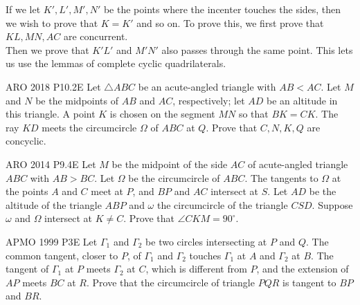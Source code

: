\begin{minipage}{.5\linewidth}
    \begin{solution}
        If we let $K', L', M', N'$ be the points where the incenter touches the
        sides, then we wish to prove that $K= K'$ and so on. To prove this, we
        first prove that $KL, MN, AC$ are concurrent. \\

        Then we prove that $K'L'$ and $M'N'$ also passes through the same
        point. This lets us use the lemmas of complete cyclic quadrilaterals.
    \end{solution}
\end{minipage}\hfill%
\begin{minipage}{.5\linewidth}
\end{minipage}



{ARO 2018 P10.2}{E}{
    Let $\triangle ABC$ be an acute-angled triangle with $AB<AC$. Let
    $M$ and $N$ be the midpoints of $AB$ and $AC$, respectively; let $AD$ be an
    altitude in this triangle. A point $K$ is chosen on the segment $MN$ so that
    $BK=CK$. The ray $KD$ meets the circumcircle $\Omega$ of $ABC$ at $Q$. Prove
    that $C, N, K, Q$ are concyclic.
}



{ARO 2014 P9.4}{E}{
    Let $M$ be the midpoint of the side $AC$ of acute-angled triangle
    $ABC$ with $AB>BC$. Let $\Omega $ be the circumcircle of $ ABC$. The tangents
    to $ \Omega $ at the points $A$ and $C$ meet at $P$, and $BP$ and $AC$
    intersect at $S$. Let $AD$ be the altitude of the triangle $ABP$ and $\omega$
    the circumcircle of the triangle $CSD$. Suppose $ \omega$ and $ \Omega $
    intersect at $K\not= C$. Prove that $ \angle CKM=90^\circ $.
}



{APMO 1999 P3}{E}{
    Let $\Gamma_1$ and $\Gamma_2$ be two circles intersecting at $P$ and
    $Q$. The common tangent, closer to $P$, of $\Gamma_1$ and $\Gamma_2$ touches
    $\Gamma_1$ at $A$ and $\Gamma_2$ at $B$. The tangent of $\Gamma_1$ at $P$
    meets $\Gamma_2$ at $C$, which is different from $P$, and the extension of
    $AP$ meets $BC$ at $R$.	Prove that the circumcircle of triangle $PQR$ is
    tangent to $BP$ and $BR$.
}



